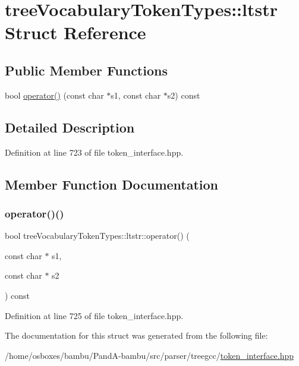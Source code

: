 \hypertarget{structtreeVocabularyTokenTypes_1_1ltstr}{}\section{tree\+Vocabulary\+Token\+Types\+:\+:ltstr Struct Reference}
\label{structtreeVocabularyTokenTypes_1_1ltstr}
\subsection*{Public Member Functions}
\begin{DoxyCompactItemize}
\item 
bool \hyperlink{structtreeVocabularyTokenTypes_1_1ltstr_aebbae0ef9ec75954a239c5143ad1d4d2}{operator()} (const char $\ast$s1, const char $\ast$s2) const
\end{DoxyCompactItemize}


\subsection{Detailed Description}


Definition at line 723 of file token\+\_\+interface.\+hpp.



\subsection{Member Function Documentation}
\mbox{\label{structtreeVocabularyTokenTypes_1_1ltstr_aebbae0ef9ec75954a239c5143ad1d4d2}} 
\subsubsection{\texorpdfstring{operator()()}{operator()()}}
{\footnotesize\ttfamily bool tree\+Vocabulary\+Token\+Types\+::ltstr\+::operator() (\begin{DoxyParamCaption}\item[{const char $\ast$}]{s1,  }\item[{const char $\ast$}]{s2 }\end{DoxyParamCaption}) const\hspace{0.3cm}{\ttfamily [inline]}}



Definition at line 725 of file token\+\_\+interface.\+hpp.



The documentation for this struct was generated from the following file\+:\begin{DoxyCompactItemize}
\item 
/home/osboxes/bambu/\+Pand\+A-\/bambu/src/parser/treegcc/\hyperlink{token__interface_8hpp}{token\+\_\+interface.\+hpp}\end{DoxyCompactItemize}
